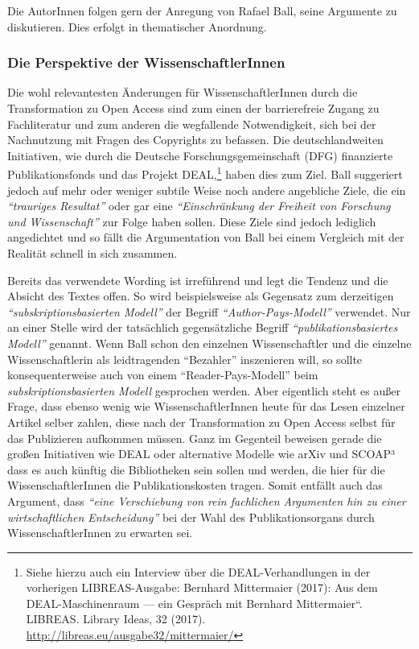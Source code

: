 \documentclass[a4paper,
fontsize=11pt,
oneside,
numbers=noperiodatend,
parskip=half-,
bibliography=totoc,
final
]{scrartcl}
\begin{document}
Die AutorInnen folgen gern der Anregung von Rafael Ball, seine Argumente
zu diskutieren. Dies erfolgt in thematischer Anordnung.

\hypertarget{die-perspektive-der-wissenschaftlerinnen}{%
\subsubsection{Die Perspektive der
WissenschaftlerInnen}\label{die-perspektive-der-wissenschaftlerinnen}}

Die wohl relevantesten Änderungen für WissenschaftlerInnen durch die
Transformation zu Open Access sind zum einen der barrierefreie Zugang zu
Fachliteratur und zum anderen die wegfallende Notwendigkeit, sich bei
der Nachnutzung mit Fragen des Copyrights zu befassen. Die
deutschlandweiten Initiativen, wie durch die Deutsche
Forschungsgemeinschaft (DFG) finanzierte Publikationsfonds und das
Projekt DEAL,\footnote{Siehe hierzu auch ein Interview über die
  DEAL-Verhandlungen in der vorherigen LIBREAS-Ausgabe: Bernhard
  Mittermaier (2017): Aus dem DEAL-Maschinenraum --- ein Gespräch mit
  Bernhard Mittermaier``. LIBREAS. Library Ideas, 32 (2017).
  \url{http://libreas.eu/ausgabe32/mittermaier/}} haben dies zum Ziel.
Ball suggeriert jedoch auf mehr oder weniger subtile Weise noch andere
angebliche Ziele, die ein \emph{\enquote{trauriges Resultat}} oder gar
eine \emph{\enquote{Einschränkung der Freiheit von Forschung und
Wissenschaft}} zur Folge haben sollen. Diese Ziele sind jedoch lediglich
angedichtet und so fällt die Argumentation von Ball bei einem Vergleich
mit der Realität schnell in sich zusammen.

Bereits das verwendete Wording ist irreführend und legt die Tendenz und
die Absicht des Textes offen. So wird beispielsweise als Gegensatz zum
derzeitigen \emph{\enquote{subskriptionsbasierten Modell}} der Begriff
\emph{\enquote{Author-Pays-Modell}} verwendet. Nur an einer Stelle wird
der tatsächlich gegensätzliche Begriff
\emph{\enquote{publikationsbasiertes Modell}} genannt. Wenn Ball schon
den einzelnen Wissenschaftler und die einzelne Wissenschaftlerin als
leidtragenden \enquote{Bezahler} inszenieren will, so sollte
konsequenterweise auch von einem \enquote{Reader-Pays-Modell} beim
\emph{subskriptionsbasierten Modell} gesprochen werden. Aber eigentlich
steht es außer Frage, dass ebenso wenig wie WissenschaftlerInnen heute
für das Lesen einzelner Artikel selber zahlen, diese nach der
Transformation zu Open Access selbst für das Publizieren aufkommen
müssen. Ganz im Gegenteil beweisen gerade die großen Initiativen wie
DEAL oder alternative Modelle wie arXiv und SCOAP³ dass es auch künftig
die Bibliotheken sein sollen und werden, die hier für die
WissenschaftlerInnen die Publikationskosten tragen. Somit entfällt auch
das Argument, dass \emph{\enquote{eine Verschiebung von rein fachlichen
Argumenten hin zu einer wirtschaftlichen Entscheidung}} bei der Wahl des
Publikationsorgans durch WissenschaftlerInnen zu erwarten sei.
\end{document}
